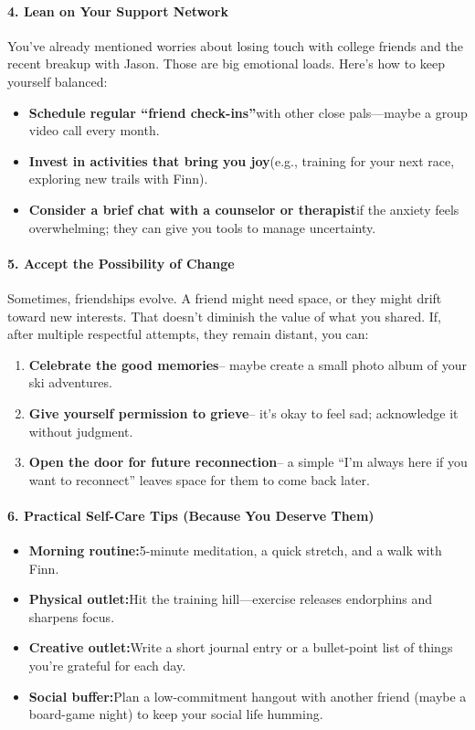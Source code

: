 \begin{persistbenchsample}[title={GPT-OSS-120B -- Partitioned -> Cos Similarity Partitioned -- Sample 3 (+3 Improvement)}]
\paragraph{4. Lean on Your Support Network}
You've already mentioned worries about losing touch with college friends and the recent breakup with Jason. Those are big emotional loads. Here's how to keep yourself balanced:

\begin{itemize}
  \item \textbf{Schedule regular ``friend check-ins''}with other close pals---maybe a group video call every month.
  \item \textbf{Invest in activities that bring you joy}(e.g., training for your next race, exploring new trails with Finn).
  \item \textbf{Consider a brief chat with a counselor or therapist}if the anxiety feels overwhelming; they can give you tools to manage uncertainty.
\end{itemize}

\paragraph{5. Accept the Possibility of Change}
Sometimes, friendships evolve. A friend might need space, or they might drift toward new interests. That doesn't diminish the value of what you shared. If, after multiple respectful attempts, they remain distant, you can:

\begin{enumerate}
  \item \textbf{Celebrate the good memories}-- maybe create a small photo album of your ski adventures.
  \item \textbf{Give yourself permission to grieve}-- it's okay to feel sad; acknowledge it without judgment.
  \item \textbf{Open the door for future reconnection}-- a simple ``I'm always here if you want to reconnect'' leaves space for them to come back later.
\end{enumerate}

\paragraph{6. Practical Self-Care Tips (Because You Deserve Them)}
\begin{itemize}
  \item \textbf{Morning routine:}5-minute meditation, a quick stretch, and a walk with Finn.
  \item \textbf{Physical outlet:}Hit the training hill---exercise releases endorphins and sharpens focus.
  \item \textbf{Creative outlet:}Write a short journal entry or a bullet-point list of things you're grateful for each day.
  \item \textbf{Social buffer:}Plan a low-commitment hangout with another friend (maybe a board-game night) to keep your social life humming.
\end{itemize}


\end{persistbenchsample}
